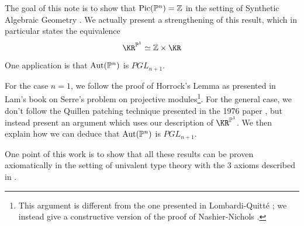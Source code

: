 The goal of this note is to show that $\mathrm{Pic}(\mathbb{P}^n) = \mathbb{Z}$ in the setting of Synthetic Algebraic
Geometry \cite{draft}. We actually present a strengthening of this result,
which in particular states the equivalence
$${\KR}^{\bP^1}\simeq \Z\times \KR$$

One application is that $\mathrm{Aut}(\mathbb{P}^n)$ is $PGL_{n+1}$.

For the case $n=1$,
we follow the proof of Horrock's Lemma as presented in Lam's book on Serre's problem \cite{Lam}
on projective modules\footnote{This argument is different from the one presented in Lombardi-Quitt\'e \cite{lombardi-quitte}; we instead give a constructive version of the proof of Nashier-Nichols \cite{Nashier}.}.
For the general case, we don't follow the Quillen patching technique
presented in the 1976 paper \cite{Quillen}, but instead present an argument which uses
our description of ${\KR}^{\bP^1}$.
We then explain how we can deduce that $\mathrm{Aut}(\mathbb{P}^n)$ is $PGL_{n+1}$.

 One point of this work is to show that all these results can be proven axiomatically in the
 setting of univalent type theory with the 3 axioms described in \cite{draft}.
